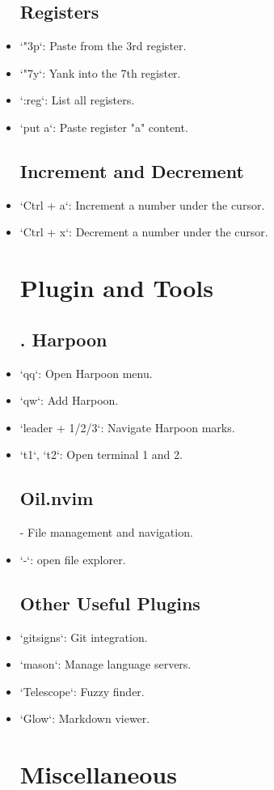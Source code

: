 \documentclass{report}
\begin{document}
\begin{itemize}
	\subsection{Registers}
\item `"3p`: Paste from the 3rd register.
\item `"7y`: Yank into the 7th register.
\item `:reg`: List all registers.
\item `put a`: Paste register "a" content.
	\subsection{Increment and Decrement}
\item `Ctrl + a`: Increment a number under the cursor.
\item `Ctrl + x`: Decrement a number under the cursor.
	\section{Plugin and Tools}
	\subsection{. Harpoon}
\item `qq`: Open Harpoon menu.
\item `qw`: Add Harpoon.
\item `leader + 1/2/3`: Navigate Harpoon marks.
\item `t1`, `t2`: Open terminal 1 and 2.

	\subsection{Oil.nvim}
- File management and navigation.
\item `-`: open file explorer.

\subsection{Other Useful Plugins}
\item `gitsigns`: Git integration.
\item `mason`: Manage language servers.
\item `Telescope`: Fuzzy finder.
\item `Glow`: Markdown viewer.
	\section{Miscellaneous}

\end{itemize}
\end{document}
